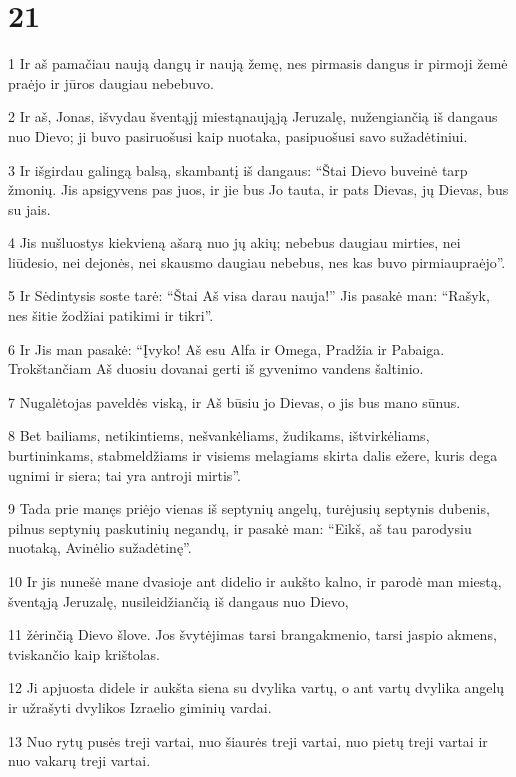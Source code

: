 \chapter{21}


\par 1 Ir aš pamačiau naują dangų ir naują žemę, nes pirmasis dangus ir pirmoji žemė praėjo ir jūros daugiau nebebuvo. 
\par 2 Ir aš, Jonas, išvydau šventąjį miestą­naująją Jeruzalę, nužengiančią iš dangaus nuo Dievo; ji buvo pasiruošusi kaip nuotaka, pasipuošusi savo sužadėtiniui. 
\par 3 Ir išgirdau galingą balsą, skambantį iš dangaus: “Štai Dievo buveinė tarp žmonių. Jis apsigyvens pas juos, ir jie bus Jo tauta, ir pats Dievas, jų Dievas, bus su jais. 
\par 4 Jis nušluostys kiekvieną ašarą nuo jų akių; nebebus daugiau mirties, nei liūdesio, nei dejonės, nei skausmo daugiau nebebus, nes kas buvo pirmiau­praėjo”. 
\par 5 Ir Sėdintysis soste tarė: “Štai Aš visa darau nauja!” Jis pasakė man: “Rašyk, nes šitie žodžiai patikimi ir tikri”. 
\par 6 Ir Jis man pasakė: “Įvyko! Aš esu Alfa ir Omega, Pradžia ir Pabaiga. Trokštančiam Aš duosiu dovanai gerti iš gyvenimo vandens šaltinio. 
\par 7 Nugalėtojas paveldės viską, ir Aš būsiu jo Dievas, o jis bus mano sūnus. 
\par 8 Bet bailiams, netikintiems, nešvankėliams, žudikams, ištvirkėliams, burtininkams, stabmeldžiams ir visiems melagiams skirta dalis ežere, kuris dega ugnimi ir siera; tai yra antroji mirtis”. 
\par 9 Tada prie manęs priėjo vienas iš septynių angelų, turėjusių septynis dubenis, pilnus septynių paskutinių negandų, ir pasakė man: “Eikš, aš tau parodysiu nuotaką, Avinėlio sužadėtinę”. 
\par 10 Ir jis nunešė mane dvasioje ant didelio ir aukšto kalno, ir parodė man miestą, šventąją Jeruzalę, nusileidžiančią iš dangaus nuo Dievo, 
\par 11 žėrinčią Dievo šlove. Jos švytėjimas tarsi brangakmenio, tarsi jaspio akmens, tviskančio kaip krištolas. 
\par 12 Ji apjuosta didele ir aukšta siena su dvylika vartų, o ant vartų dvylika angelų ir užrašyti dvylikos Izraelio giminių vardai. 
\par 13 Nuo rytų pusės treji vartai, nuo šiaurės treji vartai, nuo pietų treji vartai ir nuo vakarų treji vartai. 
